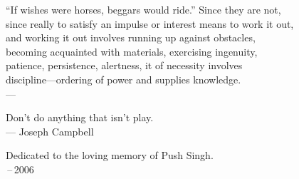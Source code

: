 \thispagestyle{empty}
{}

\vspace*{3cm}

\begin{center}
``If wishes were horses, beggars would ride.''  Since they are not, \\ \medskip
since really to satisfy an impulse or interest means to work it out, \\ \medskip
and working it out involves running up against obstacles, \\ \medskip
becoming acquainted with materials, exercising ingenuity, \\ \medskip
patience, persistence, alertness, it of necessity involves \\ \medskip
discipline---ordering of power and supplies knowledge. \\ \medskip
    ---  \citep{dewey:1907}
\end{center}

\medskip

\begin{center}
Don't do anything that isn't play. \\ \medskip
    --- Joseph Campbell
\end{center}

\medskip

\begin{center}
    Dedicated to the loving memory of Push Singh. \\ \,--\,2006
\end{center}
